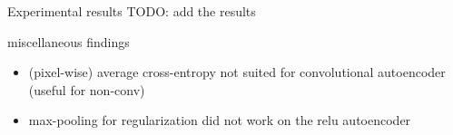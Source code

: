 \documentclass[final]{beamer}
\newlength{\onecolwid}
\begin{document}
\begin{frame}[t]
\begin{columns}[t]
\begin{column}{\onecolwid}
\begin{block}{Experimental results}
TODO: add the results
\end{block}




\begin{alertblock}{miscellaneous findings}
\begin{itemize}
	\item (pixel-wise) average cross-entropy not suited for convolutional autoencoder (useful for non-conv)
	\item max-pooling for regularization did not work on the relu autoencoder
\end{itemize}
\end{alertblock}





\end{column} %

\end{columns} %

\end{frame} %
\end{document}
